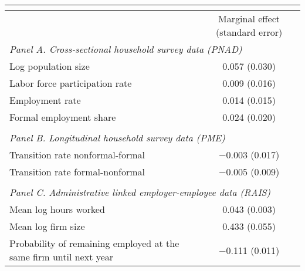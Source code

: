 \begin{tabular}{lc}
  \multicolumn{1}{c}{} & \tabularnewline
  \hline
  \hline
   & Marginal effect (standard error)\tabularnewline
  \hline
  \multicolumn{2}{l}{\emph{Panel A. Cross-sectional household survey data (PNAD)}}\tabularnewline
  Log population size & \hphantom{$-$}0.057 (0.030)\tabularnewline
  Labor force participation rate & \hphantom{$-$}0.009 (0.016)\tabularnewline
  Employment rate & \hphantom{$-$}0.014 (0.015)\tabularnewline
  Formal employment share & \hphantom{$-$}0.024 (0.020)\tabularnewline
   & \tabularnewline
  \multicolumn{2}{l}{\emph{Panel B. Longitudinal household survey data (PME)}}\tabularnewline
  Transition rate nonformal-formal & $-$0.003 (0.017)\tabularnewline
  Transition rate formal-nonformal & $-$0.005 (0.009)\tabularnewline
   & \tabularnewline
  \multicolumn{2}{l}{\emph{Panel C. Administrative linked employer-employee data (RAIS)}}\tabularnewline
  Mean log hours worked & \hphantom{$-$}0.043 (0.003)\tabularnewline
  Mean log firm size & \hphantom{$-$}0.433 (0.055)\tabularnewline
  Probability of remaining employed at the same firm until next year & $-$0.111 (0.011)\tabularnewline
  \hline
\end{tabular}

